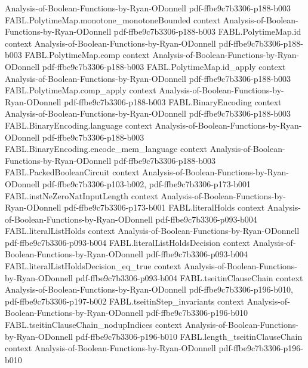 \begin{theorem}
  {Analysis-of-Boolean-Functions-by-Ryan-ODonnell}
  {pdf-ffbe9c7b3306-p188-b003}
\proofstep
  {FABL.PolytimeMap.monotone_monotoneBounded}
  {context}
  {Analysis-of-Boolean-Functions-by-Ryan-ODonnell}
  {pdf-ffbe9c7b3306-p188-b003}
\proofstep
  {FABL.PolytimeMap.id}
  {context}
  {Analysis-of-Boolean-Functions-by-Ryan-ODonnell}
  {pdf-ffbe9c7b3306-p188-b003}
\proofstep
  {FABL.PolytimeMap.comp}
  {context}
  {Analysis-of-Boolean-Functions-by-Ryan-ODonnell}
  {pdf-ffbe9c7b3306-p188-b003}
\proofstep
  {FABL.PolytimeMap.id_apply}
  {context}
  {Analysis-of-Boolean-Functions-by-Ryan-ODonnell}
  {pdf-ffbe9c7b3306-p188-b003}
\proofstep
  {FABL.PolytimeMap.comp_apply}
  {context}
  {Analysis-of-Boolean-Functions-by-Ryan-ODonnell}
  {pdf-ffbe9c7b3306-p188-b003}
\proofstep
  {FABL.BinaryEncoding}
  {context}
  {Analysis-of-Boolean-Functions-by-Ryan-ODonnell}
  {pdf-ffbe9c7b3306-p188-b003}
\proofstep
  {FABL.BinaryEncoding.language}
  {context}
  {Analysis-of-Boolean-Functions-by-Ryan-ODonnell}
  {pdf-ffbe9c7b3306-p188-b003}
\proofstep
  {FABL.BinaryEncoding.encode_mem_language}
  {context}
  {Analysis-of-Boolean-Functions-by-Ryan-ODonnell}
  {pdf-ffbe9c7b3306-p188-b003}
\proofstep
  {FABL.PackedBooleanCircuit}
  {context}
  {Analysis-of-Boolean-Functions-by-Ryan-ODonnell}
  {pdf-ffbe9c7b3306-p103-b002,
    pdf-ffbe9c7b3306-p173-b001}
\proofstep
  {FABL.instNeZeroNatInputLength}
  {context}
  {Analysis-of-Boolean-Functions-by-Ryan-ODonnell}
  {pdf-ffbe9c7b3306-p173-b001}
\proofstep
  {FABL.literalHolds}
  {context}
  {Analysis-of-Boolean-Functions-by-Ryan-ODonnell}
  {pdf-ffbe9c7b3306-p093-b004}
\proofstep
  {FABL.literalListHolds}
  {context}
  {Analysis-of-Boolean-Functions-by-Ryan-ODonnell}
  {pdf-ffbe9c7b3306-p093-b004}
\proofstep
  {FABL.literalListHoldsDecision}
  {context}
  {Analysis-of-Boolean-Functions-by-Ryan-ODonnell}
  {pdf-ffbe9c7b3306-p093-b004}
\proofstep
  {FABL.literalListHoldsDecision_eq_true}
  {context}
  {Analysis-of-Boolean-Functions-by-Ryan-ODonnell}
  {pdf-ffbe9c7b3306-p093-b004}
\proofstep
  {FABL.tseitinClauseChain}
  {context}
  {Analysis-of-Boolean-Functions-by-Ryan-ODonnell}
  {pdf-ffbe9c7b3306-p196-b010,
    pdf-ffbe9c7b3306-p197-b002}
\proofstep
  {FABL.tseitinStep_invariants}
  {context}
  {Analysis-of-Boolean-Functions-by-Ryan-ODonnell}
  {pdf-ffbe9c7b3306-p196-b010}
\proofstep
  {FABL.tseitinClauseChain_nodupIndices}
  {context}
  {Analysis-of-Boolean-Functions-by-Ryan-ODonnell}
  {pdf-ffbe9c7b3306-p196-b010}
\proofstep
  {FABL.length_tseitinClauseChain}
  {context}
  {Analysis-of-Boolean-Functions-by-Ryan-ODonnell}
  {pdf-ffbe9c7b3306-p196-b010}

\end{theorem}
